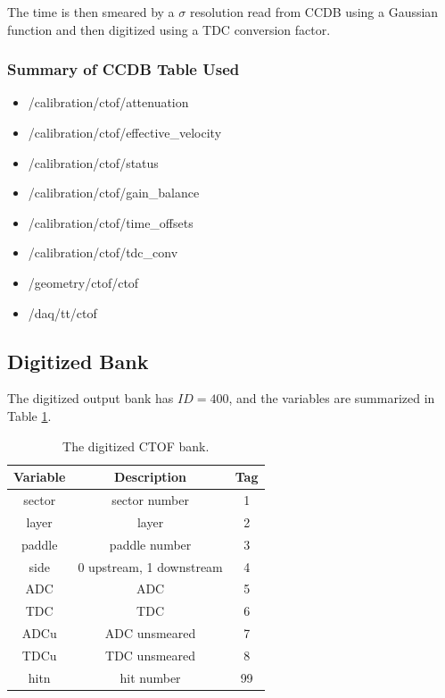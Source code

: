The time is then smeared by a $\sigma$ resolution read from CCDB using a Gaussian function and then digitized using a TDC conversion factor.


\subsubsection{Summary of CCDB Table Used}

\begin{itemize}
	\item /calibration/ctof/attenuation
	\item /calibration/ctof/effective\_velocity
	\item /calibration/ctof/status
	\item /calibration/ctof/gain\_balance
	\item /calibration/ctof/time\_offsets
	\item /calibration/ctof/tdc\_conv
	\item /geometry/ctof/ctof
	\item /daq/tt/ctof
\end{itemize}


\subsection{Digitized Bank}

The digitized output bank has $ID=400$, and the variables are summarized in Table \ref{tab:ctofBank}.

\begin{table}[h]
	\begin{center}
		\begin{tabular}{| c | c | c |}
			\hline \hline
			Variable         & Description  & Tag  \\
			\hline
              sector  &                             sector number  &    1 \\
               layer  &                                     layer  &    2 \\
              paddle  &                             paddle number  &    3 \\
                side  &                  0 upstream, 1 downstream  &    4 \\
                 ADC  &                                       ADC  &    5 \\
                 TDC  &                                       TDC  &    6 \\
                ADCu  &                             ADC unsmeared  &    7 \\
                TDCu  &                             TDC unsmeared  &    8 \\
                hitn  &                                hit number  &   99 \\
			\hline \hline
		\end{tabular}
	\end{center}
	\caption{The digitized CTOF bank.}\label{tab:ctofBank}
\end{table}

